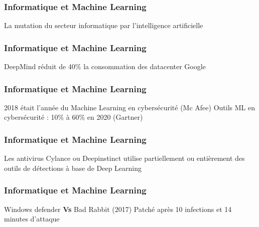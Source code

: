\begin{frame}
  \frametitle{Informatique et Machine Learning}
  La mutation du secteur informatique par l'intelligence artificielle
\end{frame}

\begin{frame}
  \frametitle{Informatique et Machine Learning}
  DeepMind réduit de 40\% la consommation des datacenter Google
\end{frame}

\begin{frame}
  \frametitle{Informatique et Machine Learning}
  2018 était l'année du Machine Learning en cybersécurité (Mc Afee)
  \newline
  Outils ML en cybersécurité : 10\% à 60\% en 2020 (Gartner)
\end{frame}

\begin{frame}
  \frametitle{Informatique et Machine Learning}
  Les antivirus Cylance ou Deepinstinct utilise partiellement ou entièrement des outils de détections à base de Deep Learning
  
  \newline
  \newline
  \begin{minipage}[c]{0.49\linewidth}
  \end{minipage}\hfill
  \begin{minipage}[c]{0.49\linewidth}
  \end{minipage}\hfill
\end{frame}

\begin{frame}
  \frametitle{Informatique et Machine Learning}
  Windows defender \textbf{Vs} Bad Rabbit (2017)
  \newline
  Patché après 10 infections et 14 minutes d'attaque
  \newline
  \newline
  \begin{minipage}[c]{0.49\linewidth}
  \end{minipage}\hfill
  \begin{minipage}[c]{0.49\linewidth}
  \end{minipage}\hfill
\end{frame}

